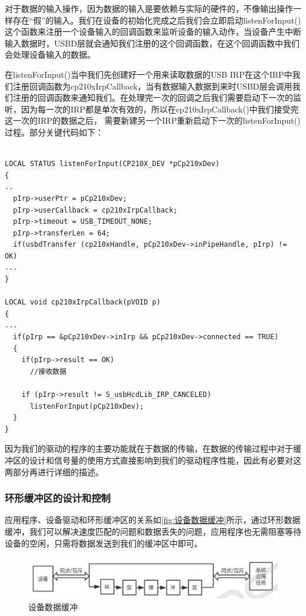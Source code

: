 	对于数据的输入操作，因为数据的输入是要依赖与实际的硬件的，不像输出操作一样存在“假”的输入。我们在设备的初始化完成之后我们会立即启动listenForInput()这个函数来注册一个设备输入的回调函数来监听设备的输入动作，当设备产生中断输入数据时，USBD层就会通知我们注册的这个回调函数，在这个回调函数中我们会处理设备输入的数据。
	
	在listenForInput()当中我们先创建好一个用来读取数据的USB IRP在这个IRP中我们注册回调函数为cp210xIrpCallback，当有数据输入数据到来时USBD层会调用我们注册的回调函数来通知我们。在处理完一次的回调之后我们需要启动下一次的监听，因为每一次的IRP都是单次有效的，所以在cp210xIrpCallback()中我们接受完这一次的IRP的数据之后， 需要新建另一个IRP重新启动下一次的listenForInput()过程。部分关键代码如下：
\lstset{language=C}
\begin{lstlisting}

LOCAL STATUS listenForInput(CP210X_DEV *pCp210xDev)
{
..
  pIrp->userPtr = pCp210xDev;
  pIrp->userCallback = cp210xIrpCallback;
  pIrp->timeout = USB_TIMEOUT_NONE;
  pIrp->transferLen = 64;
  if(usbdTransfer (cp210xHandle, pCp210xDev->inPipeHandle, pIrp) != OK)
...
}

LOCAL void cp210xIrpCallback(pVOID p)
{
...
  if(pIrp == &pCp210xDev->inIrp && pCp210xDev->connected == TRUE)
  {
	if(pIrp->result == OK)
	  //接收数据
			
	if (pIrp->result != S_usbHcdLib_IRP_CANCELED)
	  listenForInput(pCp210xDev);
  }
}

\end{lstlisting}


	因为我们的驱动的程序的主要功能就在于数据的传输，在数据的传输过程中对于缓冲区的设计和信号量的使用方式直接影响到我们的驱动程序性能，因此有必要对这两部分再进行详细的描述。
	
\subsubsection{环形缓冲区的设计和控制}
		
  应用程序、设备驱动和环形缓冲区的关系如\autoref{fig:设备数据缓冲}所示，通过环形数据缓冲，我们可以解决速度匹配的问题和数据丢失的问题，应用程序也无需阻塞等待设备的空闲，只需将数据发送到我们的缓冲区中即可。
  
\begin{figure}[!h]
\centering
\includegraphics[width=.9\textwidth]{./graphics/Dev-Data-Buf.pdf}
\caption{设备数据缓冲}\label{fig:设备数据缓冲}
\end{figure}


